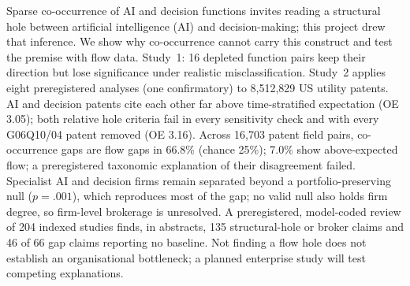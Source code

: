 Sparse co-occurrence of AI and decision functions invites reading a structural hole between artificial intelligence (AI) and decision-making; this project drew that inference. We show why co-occurrence cannot carry this construct and test the premise with flow data. Study~1: 16 depleted function pairs keep their direction but lose significance under realistic misclassification. Study~2 applies eight preregistered analyses (one confirmatory) to 8,512,829 US utility patents. AI and decision patents cite each other far above time-stratified expectation (OE 3.05); both relative hole criteria fail in every sensitivity check and with every G06Q10/04 patent removed (OE 3.16). Across 16,703 patent field pairs, co-occurrence gaps are flow gaps in 66.8\% (chance 25\%); 7.0\% show above-expected flow; a preregistered taxonomic explanation of their disagreement failed. Specialist AI and decision firms remain separated beyond a portfolio-preserving null ($p = .001$), which reproduces most of the gap; no valid null also holds firm degree, so firm-level brokerage is unresolved. A preregistered, model-coded review of 204 indexed studies finds, in abstracts, 135 structural-hole or broker claims and 46 of 66 gap claims reporting no baseline. Not finding a flow hole does not establish an organisational bottleneck; a planned enterprise study will test competing explanations.
